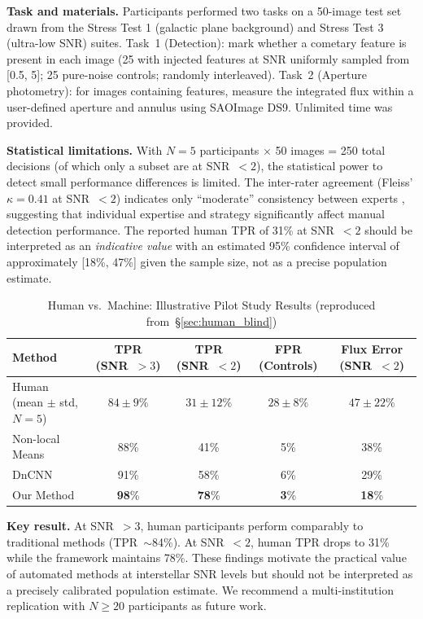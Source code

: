 \documentclass[usenatbib]{mnras}
\newcommand{\tablecomments}[1]{\vspace{4pt}{\footnotesize #1}\vspace{2pt}}
\begin{document}
\textbf{Task and materials.} Participants performed two tasks on a 50-image test set drawn from the Stress Test 1 (galactic plane background) and Stress Test 3 (ultra-low SNR) suites. Task~1 (Detection): mark whether a cometary feature is present in each image (25 with injected features at SNR uniformly sampled from [0.5, 5]; 25 pure-noise controls; randomly interleaved). Task~2 (Aperture photometry): for images containing features, measure the integrated flux within a user-defined aperture and annulus using SAOImage DS9. Unlimited time was provided.

\textbf{Statistical limitations.} With $N=5$ participants $\times$ 50 images = 250 total decisions (of which only a subset are at SNR~$<2$), the statistical power to detect small performance differences is limited. The inter-rater agreement (Fleiss' $\kappa = 0.41$ at SNR~$<2$) indicates only ``moderate'' consistency between experts \citep{landis77}, suggesting that individual expertise and strategy significantly affect manual detection performance. The reported human TPR of 31\% at SNR~$<2$ should be interpreted as an \textit{indicative value} with an estimated 95\% confidence interval of approximately [18\%, 47\%] given the sample size, not as a precise population estimate.

\begin{table}
\centering
\caption{Human vs.\ Machine: Illustrative Pilot Study Results (reproduced from~\S\ref{sec:human_blind})}\label{tab:human_vs_ai_app}
\begin{tabular}{lcccc}
\toprule
Method & TPR (SNR~$>3$) & TPR (SNR~$<2$) & FPR (Controls) & Flux Error (SNR~$<2$) \\
\midrule
Human (mean $\pm$ std, $N=5$) & $84 \pm 9\%$ & $31 \pm 12\%$ & $28 \pm 8\%$ & $47 \pm 22\%$ \\
Non-local Means & 88\% & 41\% & 5\% & 38\% \\
DnCNN \citep{zhang17} & 91\% & 58\% & 6\% & 29\% \\
Our Method & \textbf{98}\% & \textbf{78}\% & \textbf{3}\% & \textbf{18}\% \\
\bottomrule
\end{tabular}
\tablecomments{Human participants ($N=5$): convenience sample. Values are mean $\pm$ standard deviation across participants. The human TPR at SNR $<2$ has an estimated 95\% CI of [18\%, 47\%] (Clopper--Pearson exact binomial CI). Fleiss' $\kappa = 0.41$ at SNR $<2$.}
\end{table}

\textbf{Key result.} At SNR~$>3$, human participants perform comparably to traditional methods (TPR~$\sim$84\%). At SNR~$<2$, human TPR drops to 31\% while the framework maintains 78\%. These findings motivate the practical value of automated methods at interstellar SNR levels but should not be interpreted as a precisely calibrated population estimate. We recommend a multi-institution replication with $N \geq 20$ participants as future work.
\end{document}
